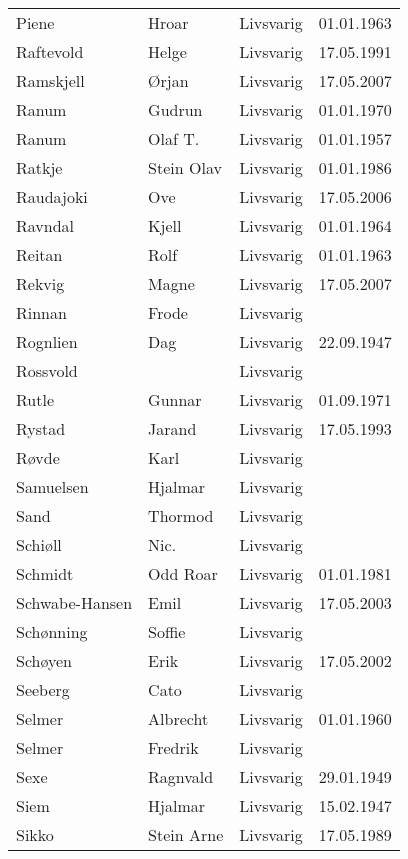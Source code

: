 \begin{longtable}{llll}
        Piene	&	Hroar	&	Livsvarig 	&	01.01.1963	\\
        Raftevold	&	Helge	&	Livsvarig 	&	17.05.1991	\\
        Ramskjell	&	Ørjan	&	Livsvarig	&	17.05.2007	\\
        Ranum	&	Gudrun	&	Livsvarig 	&	01.01.1970	\\
        Ranum	&	Olaf T.	&	Livsvarig 	&	01.01.1957	\\
        Ratkje	&	Stein Olav	&	Livsvarig 	&	01.01.1986	\\
        Raudajoki	&	Ove	&	Livsvarig	&	17.05.2006	\\
        Ravndal	&	Kjell	&	Livsvarig 	&	01.01.1964	\\
        Reitan	&	Rolf	&	Livsvarig 	&	01.01.1963	\\
        Rekvig	&	Magne	&	Livsvarig	&	17.05.2007	\\
        Rinnan	&	Frode	&	Livsvarig 	&		\\
        Rognlien	&	Dag	&	Livsvarig 	&	22.09.1947	\\
        Rossvold	&		&	Livsvarig 	&		\\
        Rutle	&	Gunnar	&	Livsvarig 	&	01.09.1971	\\
        Rystad	&	Jarand	&	Livsvarig 	&	17.05.1993	\\
        Røvde	&	Karl	&	Livsvarig 	&		\\
        Samuelsen	&	Hjalmar	&	Livsvarig 	&		\\
        Sand	&	Thormod	&	Livsvarig 	&		\\
        Schiøll	&	Nic.	&	Livsvarig 	&		\\
        Schmidt	&	Odd Roar	&	Livsvarig 	&	01.01.1981	\\
        Schwabe-Hansen 	&	Emil	&	Livsvarig	&	17.05.2003	\\
        Schønning	&	Soffie	&	Livsvarig 	&		\\
        Schøyen 	&	Erik	&	Livsvarig	&	17.05.2002	\\
        Seeberg	&	Cato	&	Livsvarig 	&		\\
        Selmer	&	Albrecht	&	Livsvarig 	&	01.01.1960	\\
        Selmer	&	Fredrik	&	Livsvarig 	&		\\
        Sexe	&	Ragnvald	&	Livsvarig 	&	29.01.1949	\\
        Siem	&	Hjalmar	&	Livsvarig 	&	15.02.1947	\\
        Sikko	&	Stein Arne	&	Livsvarig 	&	17.05.1989	\\

\end{longtable}

